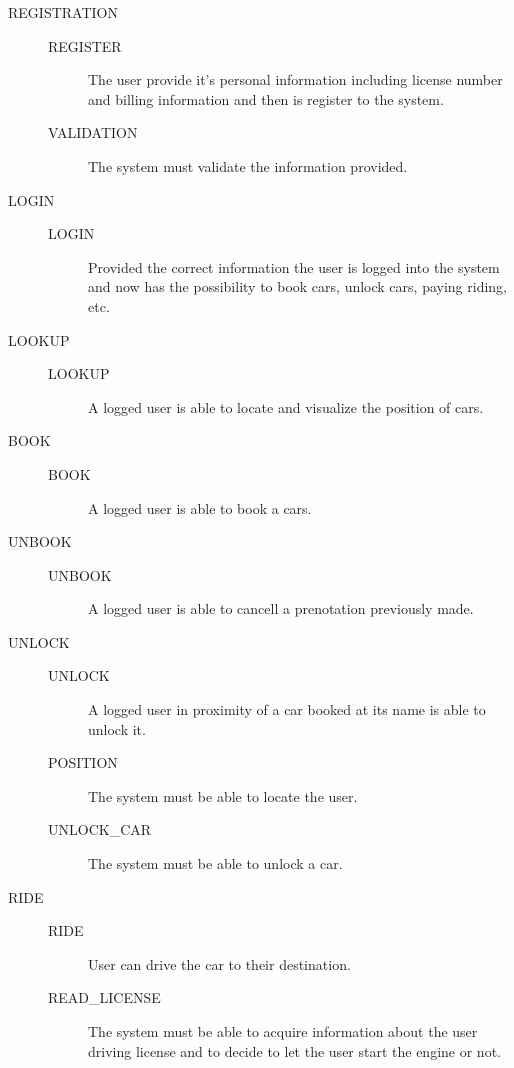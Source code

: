 \documentclass[11pt]{article} %
\begin{document}
\begin{description}
	\item[REGISTRATION] \hfill
		\begin{description}
			\item[REGISTER] The user provide it's personal information including license number and billing information and then is register to the system.
			\item[VALIDATION] The system must validate the information provided.
		\end{description}
	\item[LOGIN] \hfill
		\begin{description}
			\item[LOGIN] Provided the correct information the user is logged into the system and now has the possibility to book cars, unlock cars, paying riding, etc.
		\end{description}
	\item[LOOKUP] \hfill
		\begin{description}
			\item[LOOKUP] A logged user is able to locate and visualize the position of cars.
		\end{description}
	\item[BOOK] \hfill
		\begin{description}
			\item[BOOK] A logged user is able to book a cars.
		\end{description}
	\item[UNBOOK] \hfill
		\begin{description}
			\item[UNBOOK] A logged user is able to cancell a prenotation previously made.
		\end{description}
	\item[UNLOCK] \hfill
		\begin{description}
			\item[UNLOCK] A logged user in proximity of a car booked at its name is able to unlock it.
			\item[POSITION] The system must be able to locate the user.
			\item[UNLOCK\_CAR] The system must be able to unlock a car.
		\end{description}
	\item[RIDE] \hfill
		\begin{description}
			\item[RIDE] User can drive the car to their destination.
			\item[READ\_LICENSE] The system must be able to acquire information about the user driving license and to decide to let the user start the engine or not.

\end{description}
\end{description}
\end{document}
